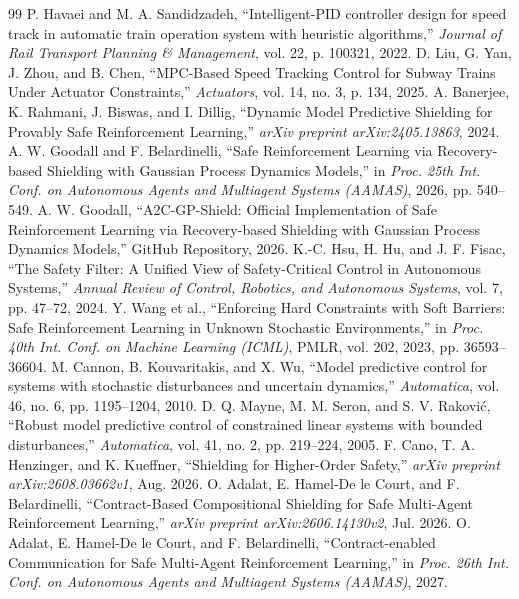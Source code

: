 \documentclass[10pt,a4paper]{article}
\begin{document}
\begin{thebibliography}{99}
\footnotesize
{} P. Havaei and M. A. Sandidzadeh, ``Intelligent-PID controller design for speed track in automatic train operation system with heuristic algorithms,'' \textit{Journal of Rail Transport Planning \& Management}, vol. 22, p. 100321, 2022.
 D. Liu, G. Yan, J. Zhou, and B. Chen, ``MPC-Based Speed Tracking Control for Subway Trains Under Actuator Constraints,'' \textit{Actuators}, vol. 14, no. 3, p. 134, 2025.
 A. Banerjee, K. Rahmani, J. Biswas, and I. Dillig, ``Dynamic Model Predictive Shielding for Provably Safe Reinforcement Learning,'' \textit{arXiv preprint arXiv:2405.13863}, 2024.
 A. W. Goodall and F. Belardinelli, ``Safe Reinforcement Learning via Recovery-based Shielding with Gaussian Process Dynamics Models,'' in \textit{Proc. 25th Int. Conf. on Autonomous Agents and Multiagent Systems (AAMAS)}, 2026, pp. 540--549.
 A. W. Goodall, ``A2C-GP-Shield: Official Implementation of Safe Reinforcement Learning via Recovery-based Shielding with Gaussian Process Dynamics Models,'' GitHub Repository, 2026.
 K.-C. Hsu, H. Hu, and J. F. Fisac, ``The Safety Filter: A Unified View of Safety-Critical Control in Autonomous Systems,'' \textit{Annual Review of Control, Robotics, and Autonomous Systems}, vol. 7, pp. 47--72, 2024.
 Y. Wang et al., ``Enforcing Hard Constraints with Soft Barriers: Safe Reinforcement Learning in Unknown Stochastic Environments,'' in \textit{Proc. 40th Int. Conf. on Machine Learning (ICML)}, PMLR, vol. 202, 2023, pp. 36593--36604.
 M. Cannon, B. Kouvaritakis, and X. Wu, ``Model predictive control for systems with stochastic disturbances and uncertain dynamics,'' \textit{Automatica}, vol. 46, no. 6, pp. 1195--1204, 2010.
 D. Q. Mayne, M. M. Seron, and S. V. Rakovi\'{c}, ``Robust model predictive control of constrained linear systems with bounded disturbances,'' \textit{Automatica}, vol. 41, no. 2, pp. 219--224, 2005.
 F. Cano, T. A. Henzinger, and K. Kueffner, ``Shielding for Higher-Order Safety,'' \textit{arXiv preprint arXiv:2608.03662v1}, Aug. 2026.
 O. Adalat, E. Hamel-De le Court, and F. Belardinelli, ``Contract-Based Compositional Shielding for Safe Multi-Agent Reinforcement Learning,'' \textit{arXiv preprint arXiv:2606.14130v2}, Jul. 2026.
 O. Adalat, E. Hamel-De le Court, and F. Belardinelli, ``Contract-enabled Communication for Safe Multi-Agent Reinforcement Learning,'' in \textit{Proc. 26th Int. Conf. on Autonomous Agents and Multiagent Systems (AAMAS)}, 2027.

\end{thebibliography}
\end{document}
